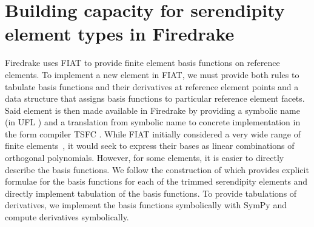 \documentclass[format=acmsmall,screen,timestamp=false,a4paper]{acmart}
\DeclareMathOperator{\Div}{div}
\DeclareMathOperator{\curl}{curl}
\newcommand\akg[1]{\textbf{\textcolor[rgb]{.5,0,1}{[Andrew: #1]}}}
\newcommand\lm[1]{\textbf{\textcolor[rgb]{1,0,0.5}{[Lawrence: #1]}}}
\newcommand\rck[1]{\textbf{\textcolor[rgb]{1,0.5,0.5}{[Rob: #1]}}}
\newcommand{\hcurl}{\ensuremath{{H}(\curl)}\xspace}
\newcommand{\hdiv}{\ensuremath{{H}(\Div)}\xspace}
\begin{document}
  
  
  \section{Building capacity for serendipity element types in Firedrake}
  \label{sec:buildcap}

  Firedrake uses FIAT \cite{kirby2004algorithm,kirby2012fiat} to provide finite element basis functions on reference elements.  
  To implement a new element in FIAT, we must provide both rules to tabulate basis functions and their derivatives at reference element points and a data structure that assigns basis functions to particular reference element facets.
  Said element is then made available in Firedrake by providing a symbolic name (in UFL \cite{alnaes2014unified}) and a translation from symbolic name to concrete implementation in the form compiler TSFC \cite{homolya2018tsfc}.  While FIAT initially considered a very wide range of finite elements~\cite{kirby2012common}, it would seek to express their bases as linear combinations of orthogonal polynomials.  However, for some elements, it is easier to directly describe the basis functions.
  We follow the construction of \citet{gillette2019computational} which provides explicit formulae for the basis functions for each of the trimmed serendipity elements and directly implement tabulation of the basis functions. To provide tabulations of derivatives, we implement the basis functions symbolically with SymPy \cite{sympy2017} and compute derivatives symbolically.  %
  
  
  
\end{document}
